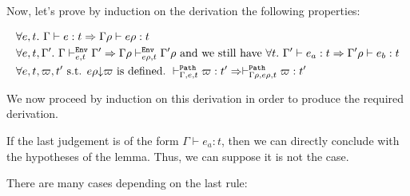 \documentclass[a4paper]{article}
\theoremstyle{definition}
\begin{document}
        Now, let's prove by induction on the derivation the following properties:

        \begin{align*}
          &\forall e,t.\ \Gamma \vdash e:t \Rightarrow \Gamma\rho \vdash e\rho:t\\
          &\forall e,t,\Gamma'.\ \Gamma \vdash^{\texttt{Env}}_{e,t} \Gamma' \Rightarrow \Gamma\rho \vdash^{\texttt{Env}}_{e\rho,t} {\Gamma'}\rho
          \text{ and we still have } \forall t.\ \Gamma' \vdash e_a : t \Rightarrow \Gamma'\rho \vdash e_b:t\\
          &\forall e,t,\varpi,t' \text{ s.t. $e\rho{\downarrow}\varpi$ is defined}.\ \vdash^{\texttt{Path}}_{\Gamma,e,t} \varpi:t' \Rightarrow \vdash^{\texttt{Path}}_{\Gamma\rho,e\rho,t} \varpi:t'
        \end{align*}

        We now proceed by induction on this derivation in order to produce the required derivation.
        
        If the last judgement is of the form $\Gamma \vdash e_a: t$, then we can directly conclude with the hypotheses of the lemma.
        Thus, we can suppose it is not the case.

        There are many cases depending on the last rule:
\end{document}
